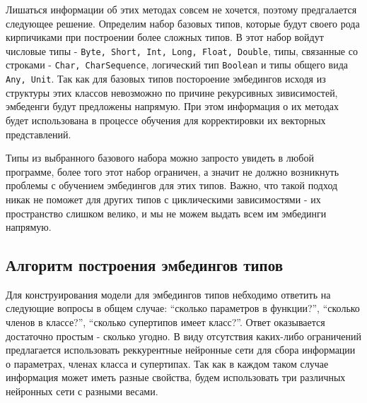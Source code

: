 \documentclass[times,specification,annotation]{itmo-student-thesis}
\begin{document}
Лишаться информации об этих методах совсем не хочется, поэтому предгалается следующее решение. Определим набор базовых типов, которые будут своего рода кирпичиками при построении более сложных типов. В этот набор войдут числовые типы - \texttt{Byte, Short, Int, Long, Float, Double}, типы, связанные со строками - \texttt{Char, CharSequence}, логический тип \texttt{Boolean} и типы общего вида \texttt{Any, Unit}. Так как для базовых типов постороение эмбедингов исходя из структуры этих классов невозможно по причине рекурсивных зивисимостей, эмбеденги будут предложены напрямую. При этом информация о их методах будет использована в процессе обучения для корректировки их векторных представлений.

Типы из выбранного базового набора можно запросто увидеть в любой программе, более того этот набор ограничен, а значит не должно возникнуть проблемы с обучением эмбедингов для этих типов. Важно, что такой подход никак не поможет для других типов с циклическими зависимостями - их пространство слишком велико, и мы не можем выдать всем им эмбединги напрямую.

\subsection{Алгоритм построения эмбедингов типов}\label{typeEmbAlgo}
Для конструирования модели для эмбедингов типов небходимо ответить на следующие вопросы в общем случае: ``сколько параметров в функции?'', ``сколько членов в классе?'', ``сколько супертипов имеет класс?''. Ответ оказывается достаточно простым - сколько угодно. В виду отсутствия каких-либо ограничений предлагается использовать реккурентные нейронные сети для сбора информации о параметрах, членах класса и супертипах. Так как в каждом таком случае информация может иметь разные свойства, будем использовать три различных нейронных сети с разными весами.
\end{document}
